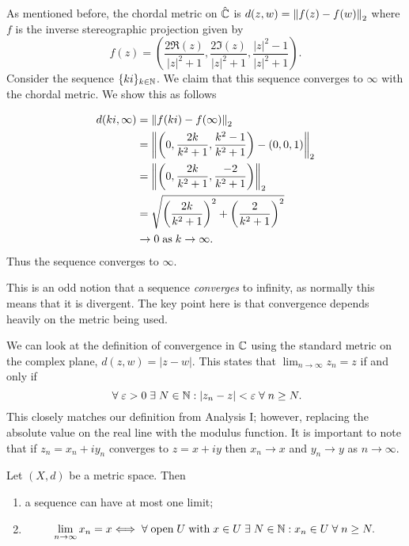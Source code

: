  \begin{example}
    As mentioned before, the chordal metric on 
    $\hat {\mathbb{C}}$ is $d(z, w) = \left\lVert f(z) - f(w)\right\rVert_2$
    where $f$ is the inverse stereographic projection given by
    \[ f(z) = \left( \frac{2\Re{(z)}}{\lvert z \rvert^2 + 1}, \frac{2\Im{(z)}}{\lvert z \rvert^2 + 1}, \frac{\lvert z \rvert^2 - 1}{\lvert z \rvert^2 + 1}\right). \]
    Consider the sequence 
    $\{ ki \}_{k \in \mathbb{N}}$. 
    We claim that this sequence converges to $\infty$ with the chordal metric. We show this as follows

    \begin{align*}
        d(ki, \infty) &= \left\lVert f(ki) - f(\infty)\right\rVert_2 \\
                      &= \left\lVert\left(0, \frac{2k}{k^2 + 1}, \frac{k^2 - 1}{k^2 + 1}\right) - (0, 0, 1)\right\rVert_2 \\
                      &= \left\lVert\left(0, \frac{2k}{k^2 + 1}, \frac{-2}{k^2 + 1}\right)\right\rVert_2 \\
                      &= \sqrt{\left(\frac{2k}{k^2 + 1}\right)^2 + \left(\frac{2}{k^2+1}\right)^2} \\
                      &\to 0 \;\text{as}\; k \to \infty.
    \end{align*}
    Thus the sequence converges to $\infty$.
\end{example}

\begin{remark}
    This is an odd notion that a sequence \emph{converges} to infinity, as normally this means that it is divergent. The key point here is that convergence depends heavily on the metric being used.
\end{remark}

\begin{example}
    We can look at the definition of convergence in $\mathbb{C}$ using the standard metric on the complex plane, $d(z, w) = \lvert z - w \rvert$. This states that $\lim_{n \to \infty} z_n = z$ if and only if
    \[ \;\forall\; \varepsilon > 0 \;\exists\; N \in \mathbb{N} : \lvert z_n - z \rvert < \varepsilon \;\forall\; n \geq N. \]
    This closely matches our definition from Analysis I; however, replacing the absolute value on the real line with the modulus function. It is important to note that if $z_n = x_n + iy_n$ converges to $z = x+iy$ then $x_n \to x$ and $y_n \to y$ as $n \to \infty$.
\end{example}

\begin{lemma}
    Let $(X, d)$ be a metric space. Then
    \begin{enumerate}
        \item a sequence can have at most one limit; 
        \item 
            \[ \lim_{n \to \infty} x_n = x \Longleftrightarrow \;\forall\; \text{open}\; U \;\text{with}\; x \in U \;\exists\; N \in \mathbb{N} : x_n \in U \;\forall\; n \geq N. \]
    \end{enumerate}
\end{lemma}

